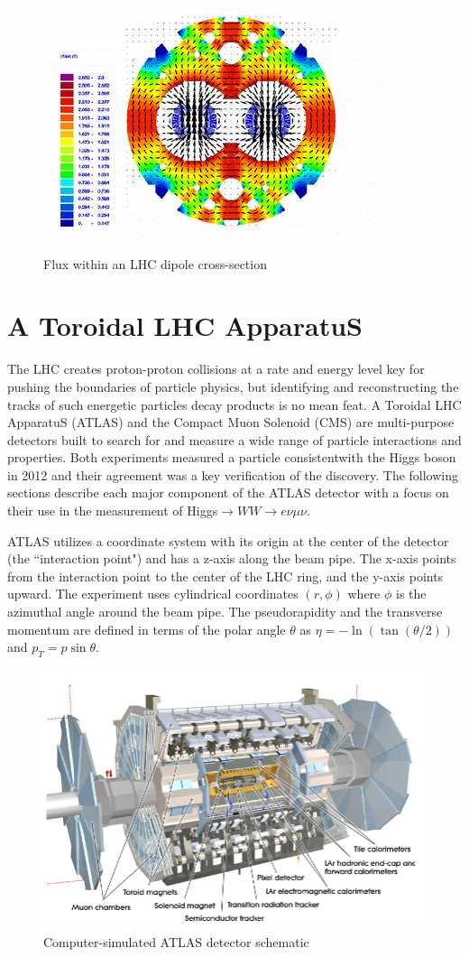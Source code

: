 \begin{figure}[!h]
        \centering
    \includegraphics[width=.6\textwidth]{Pictures/dipolemagnet.jpg}
    \caption{ Flux within an LHC dipole cross-section \cite{LHCref}}
    \label{fig:dipolemagnet}
\end{figure}

\section{A Toroidal LHC ApparatuS}
\hspace{20pt} The LHC creates proton-proton collisions at a rate and energy level key for pushing the boundaries of particle physics, but identifying and reconstructing the tracks of such energetic particles decay products is no mean feat. A Toroidal LHC ApparatuS (ATLAS) and the Compact Muon Solenoid (CMS) are multi-purpose detectors built to search for and measure a wide range of particle interactions and properties. Both experiments measured a particle consistentwith the Higgs boson in 2012 and their agreement was a key verification of the discovery. The following sections describe each major component of the ATLAS detector with a focus on their use in the measurement of Higgs$\rightarrow WW \rightarrow e\nu\mu\nu$. 

ATLAS utilizes a coordinate system with its origin at the center of the detector (the ``interaction point") and has a z-axis along the beam pipe. The x-axis points from the interaction point to the center of the LHC ring, and the y-axis points upward. The experiment uses cylindrical coordinates $(r, \phi)$ where $\phi$ is the azimuthal angle around the beam pipe. The pseudorapidity and the transverse momentum are defined in terms of the polar angle $\theta$ as $\eta = -\ln( \tan(\theta/2))$ and $p_T = p\sin\theta$. 
\begin{figure}[!h]
	\centering     \includegraphics[width=.7\textwidth]{Pictures/ATLASdetector.PNG}
    \caption{Computer-simulated ATLAS detector schematic \cite{detector}}
\end{figure}

